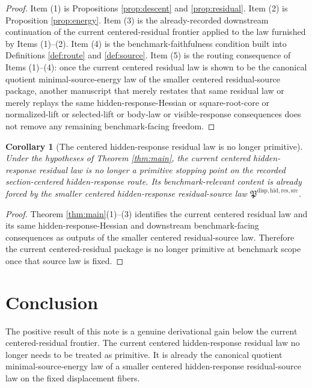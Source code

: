 \documentclass[11pt]{article}
\newcommand{\ResidualSourceLawPackage}{\mathfrak P^{\mathrm{disp,hid,res,src}}}
\newtheorem{corollary}{Corollary}
\begin{document}
\begin{proof}
Item (1) is Propositions \ref{prop:descent} and \ref{prop:residual}. Item (2) is Proposition \ref{prop:energy}. Item (3) is the already-recorded downstream continuation of the current centered-residual frontier applied to the law furnished by Items (1)--(2). Item (4) is the benchmark-faithfulness condition built into Definitions \ref{def:route} and \ref{def:source}. Item (5) is the routing consequence of Items (1)--(4): once the current centered residual law is shown to be the canonical quotient minimal-source-energy law of the smaller centered residual-source package, another manuscript that merely restates that same residual law or merely replays the same hidden-response-Hessian or square-root-core or normalized-lift or selected-lift or body-law or visible-response consequences does not remove any remaining benchmark-facing freedom.
\end{proof}

\begin{corollary}[The centered hidden-response residual law is no longer primitive]
\label{cor:nonprimitive}
Under the hypotheses of Theorem \ref{thm:main}, the current centered hidden-response residual law is no longer a primitive stopping point on the recorded section-centered hidden-response route. Its benchmark-relevant content is already forced by the smaller centered hidden-response residual-source law \(\ResidualSourceLawPackage\).
\end{corollary}

\begin{proof}
Theorem \ref{thm:main}(1)--(3) identifies the current centered residual law and its same hidden-response-Hessian and downstream benchmark-facing consequences as outputs of the smaller centered residual-source law. Therefore the current centered-residual package is no longer primitive at benchmark scope once that source law is fixed.
\end{proof}

\section{Conclusion}

The positive result of this note is a genuine derivational gain below the current centered-residual frontier. The current centered hidden-response residual law no longer needs to be treated as primitive. It is already the canonical quotient minimal-source-energy law of a smaller centered hidden-response residual-source law on the fixed displacement fibers.
\end{document}
